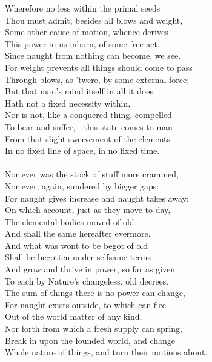 Wherefore no less within the primal seeds\\
Thou must admit, besides all blows and weight,\\
Some other cause of motion, whence derives\\
This power in us inborn, of some free act.—\\
Since naught from nothing can become, we see.\\
For weight prevents all things should come to pass\\
Through blows, as 'twere, by some external force;\\
But that man's mind itself in all it does\\
Hath not a fixed necessity within,\\
Nor is not, like a conquered thing, compelled\\
To bear and suffer,—this state comes to man\\
From that slight swervement of the elements\\
In no fixed line of space, in no fixed time.\\
\\
Nor ever was the stock of stuff more crammed,\\
Nor ever, again, sundered by bigger gaps:\\
For naught gives increase and naught takes away;\\
On which account, just as they move to-day,\\
The elemental bodies moved of old\\
And shall the same hereafter evermore.\\
And what was wont to be begot of old\\
Shall be begotten under selfsame terms\\
And grow and thrive in power, so far as given\\
To each by Nature's changeless, old decrees.\\
The sum of things there is no power can change,\\
For naught exists outside, to which can flee\\
Out of the world matter of any kind,\\
Nor forth from which a fresh supply can spring,\\
Break in upon the founded world, and change\\
Whole nature of things, and turn their motions about.


